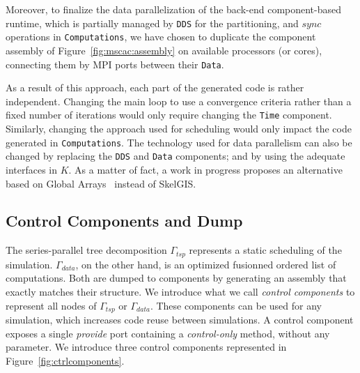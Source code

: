 Moreover, to finalize the data parallelization of the back-end component-based runtime, which is partially managed by \texttt{DDS} for the partitioning, and $sync$ operations in \texttt{Computations}, we have chosen to duplicate the component assembly of Figure~\ref{fig:mscac:assembly} on available processors (or cores), connecting them by MPI ports between their \texttt{Data}.

As a result of this approach, each part of the generated code is rather independent.
Changing the main loop to use a convergence criteria rather than a fixed number of iterations would only require changing the \texttt{Time} component.
Similarly, changing the approach used for scheduling would only impact the code generated in \texttt{Computations}.
The technology used for data parallelism can also be changed by replacing the \texttt{DDS} and \texttt{Data} components; and by using the adequate interfaces in $K$. As a matter of fact, a work in progress proposes an alternative based on Global Arrays~\cite{Nieplocha:2006:AAP:1125980.1125985} instead of SkelGIS.
  
\subsection{Control Components and Dump}
\label{sect:control}
The series-parallel tree decomposition $\Gamma_{tsp}$ represents a static scheduling of the simulation. $\Gamma_{data}$, on the other hand, is an optimized fusionned ordered list of computations. Both are dumped to components by generating an assembly that exactly matches their structure.
We introduce what we call \emph{control components} to represent all nodes of $\Gamma_{tsp}$ or $\Gamma_{data}$.
These components can be used for any simulation, which increases code reuse between simulations.
A control component exposes a single \emph{provide} port containing a \emph{control-only} method, without any parameter.
We introduce three control components represented in Figure~\ref{fig:ctrlcomponents}.

